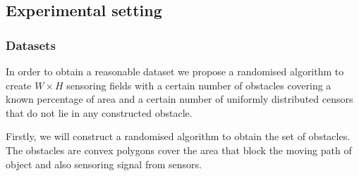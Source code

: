 \documentclass[final]{elsarticle}
\begin{document}
\subsection{Experimental setting}
\subsubsection{Datasets}

In order to obtain a reasonable dataset we propose a randomised algorithm to create $W \times H$ sensoring fields with a certain number of obstacles covering a known percentage of area and a certain number of uniformly distributed censors that do not lie in any constructed obstacle.

Firstly, we will construct a randomised algorithm to obtain the set of obstacles. The obstacles are convex polygons cover the area that block the moving path of object and also sensoring signal from sensors.
\end{document}
